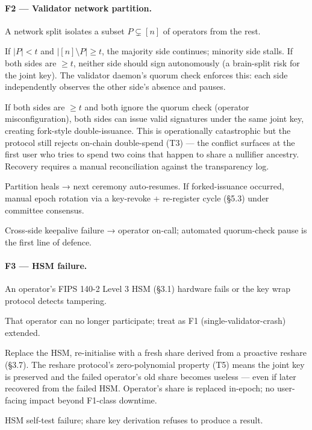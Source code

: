 \paragraph{F2 --- Validator network partition.}
\begin{description}[leftmargin=2em,style=nextline,itemsep=0pt]
  \item[Trigger] A network split isolates a subset $P \subsetneq [n]$
    of operators from the rest.
  \item[Consequence] If $|P| < t$ and $|[n] \setminus P| \geq t$,
    the majority side continues; minority side stalls.
    If both sides are $\geq t$, neither side should sign autonomously
    (a brain-split risk for the joint key). The validator daemon's
    quorum check enforces this: each side independently observes
    the other side's absence and pauses.
  \item[Consequence (rare)] If both sides are $\geq t$ and both ignore
    the quorum check (operator misconfiguration), both sides can issue
    valid signatures under the same joint key, creating fork-style
    double-issuance. This is operationally catastrophic but the
    protocol still rejects on-chain double-spend (T3) — the conflict
    surfaces at the first user who tries to spend two coins that
    happen to share a nullifier ancestry. Recovery requires a manual
    reconciliation against the transparency log.
  \item[Recovery] Partition heals → next ceremony auto-resumes. If
    forked-issuance occurred, manual epoch rotation via a key-revoke
    + re-register cycle (\S5.3) under committee consensus.
  \item[Detection] Cross-side keepalive failure → operator on-call;
    automated quorum-check pause is the first line of defence.
\end{description}

\paragraph{F3 --- HSM failure.}
\begin{description}[leftmargin=2em,style=nextline,itemsep=0pt]
  \item[Trigger] An operator's FIPS 140-2 Level 3 HSM (\S3.1) hardware
    fails or the key wrap protocol detects tampering.
  \item[Consequence] That operator can no longer participate; treat as
    F1 (single-validator-crash) extended.
  \item[Recovery] Replace the HSM, re-initialise with a fresh share
    derived from a proactive reshare (\S3.7). The reshare protocol's
    zero-polynomial property (T5) means the joint key is preserved
    and the failed operator's old share becomes useless — even if
    later recovered from the failed HSM. Operator's share is replaced
    in-epoch; no user-facing impact beyond F1-class downtime.
  \item[Detection] HSM self-test failure; share key derivation
    refuses to produce a result.
\end{description}

